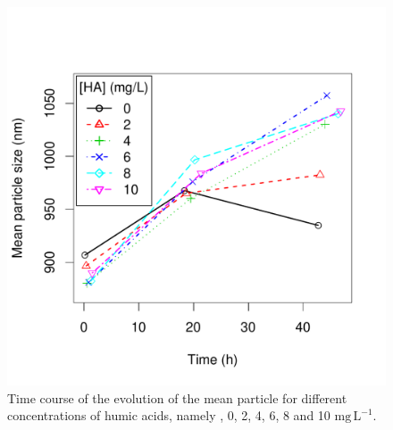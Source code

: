 \documentclass[journal=langd5,manuscript=article]{achemso}
\begin{document}
 \begin{figure}
  \includegraphics[width=\linewidth]{Figures/mean_particle_size.pdf}
  \caption{Time course of the evolution of the mean particle for different concentrations of humic acids, namely , 0, 2, 4, 6, 8 and 10 $\mathrm{mg\,L^{-1}}$.} 
  \label{fgr:meansize}
\end{figure}






% 
% 
% 
\end{document}
